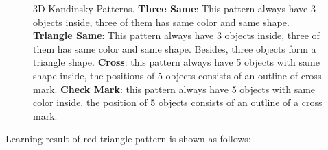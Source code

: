 \documentclass[
]{ceurart}
\begin{document}
\begin{figure}[!htb]
	\centering
	\caption{3D Kandinsky Patterns. \textbf{Three Same}: This pattern always have 3 objects inside, three of them has same color and same shape. \textbf{Triangle Same}: This pattern always have 3 objects inside, three of them has same color and same shape. Besides, three objects form a triangle shape. \textbf{Cross}: this pattern always have 5 objects with same shape inside, the positions of 5 objects consists of an outline of cross mark. \textbf{Check Mark}: this pattern always have 5 objects with same color inside, the position of 5 objects consists of an outline of a cross mark.}
	\label{fig:3DKP-patterns}
\end{figure}

Learning result of red-triangle pattern is shown as follows:
\end{document}
